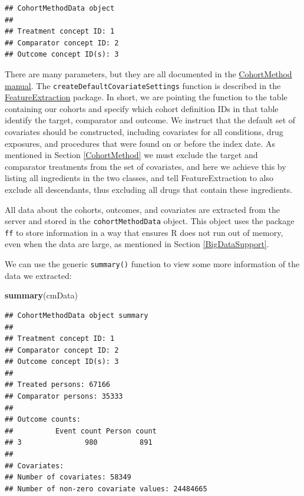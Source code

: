 \documentclass[11pt]{book}
\newenvironment{Shaded}{\begin{snugshade}}{\end{snugshade}}
\newcommand{\KeywordTok}[1]{\textcolor[rgb]{0.13,0.29,0.53}{\textbf{#1}}}
\newcommand{\NormalTok}[1]{#1}
\theoremstyle{definition}
\theoremstyle{definition}
\theoremstyle{definition}
\theoremstyle{remark}
\begin{document}
\begin{verbatim}
## CohortMethodData object
## 
## Treatment concept ID: 1
## Comparator concept ID: 2
## Outcome concept ID(s): 3
\end{verbatim}

There are many parameters, but they are all documented in the \href{https://ohdsi.github.io/CohortMethod/reference/}{CohortMethod manual}. The \texttt{createDefaultCovariateSettings} function is described in the \href{https://ohdsi.github.io/FeatureExtraction/}{FeatureExtraction} package. In short, we are pointing the function to the table containing our cohorts and specify which cohort definition IDs in that table identify the target, comparator and outcome. We instruct that the default set of covariates should be constructed, including covariates for all conditions, drug exposures, and procedures that were found on or before the index date. As mentioned in Section \ref{CohortMethod} we must exclude the target and comparator treatments from the set of covariates, and here we achieve this by listing all ingredients in the two classes, and tell FeatureExtraction to also exclude all descendants, thus excluding all drugs that contain these ingredients.

All data about the cohorts, outcomes, and covariates are extracted from the server and stored in the \texttt{cohortMethodData} object. This object uses the package \texttt{ff} to store information in a way that ensures R does not run out of memory, even when the data are large, as mentioned in Section \ref{BigDataSupport}.

We can use the generic \texttt{summary()} function to view some more information of the data we extracted:

\begin{Shaded}
\begin{Highlighting}[]
\KeywordTok{summary}\NormalTok{(cmData)}
\end{Highlighting}
\end{Shaded}

\begin{verbatim}
## CohortMethodData object summary
## 
## Treatment concept ID: 1
## Comparator concept ID: 2
## Outcome concept ID(s): 3
## 
## Treated persons: 67166
## Comparator persons: 35333
## 
## Outcome counts:
##          Event count Person count
## 3               980          891
## 
## Covariates:
## Number of covariates: 58349
## Number of non-zero covariate values: 24484665
\end{verbatim}
\end{document}
